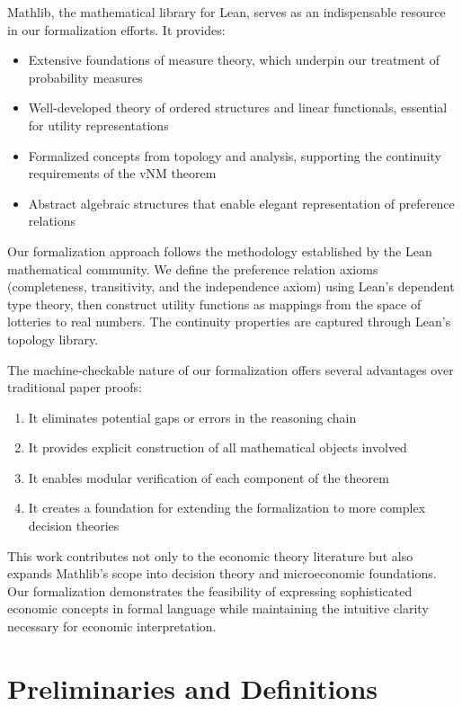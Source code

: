 \documentclass{article}
\theoremstyle{definition}
\begin{document}
Mathlib\cite{MathlibCommunity2020}, the mathematical library for Lean, serves as an indispensable resource in our formalization efforts. It provides:

\begin{itemize}
    \item Extensive foundations of measure theory, which underpin our treatment of probability measures
    \item Well-developed theory of ordered structures and linear functionals, essential for utility representations
    \item Formalized concepts from topology and analysis, supporting the continuity requirements of the vNM theorem
    \item Abstract algebraic structures that enable elegant representation of preference relations
\end{itemize}

Our formalization approach follows the methodology established by the Lean mathematical community. We define the preference relation axioms (completeness, transitivity, and the independence axiom) using Lean's dependent type theory, then construct utility functions as mappings from the space of lotteries to real numbers. The continuity properties are captured through Lean's topology library.

The machine-checkable nature of our formalization offers several advantages over traditional paper proofs:

\begin{enumerate}
    \item It eliminates potential gaps or errors in the reasoning chain
    \item It provides explicit construction of all mathematical objects involved
    \item It enables modular verification of each component of the theorem
    \item It creates a foundation for extending the formalization to more complex decision theories
\end{enumerate}

This work contributes not only to the economic theory literature but also expands Mathlib's scope into decision theory and microeconomic foundations. Our formalization demonstrates the feasibility of expressing sophisticated economic concepts in formal language while maintaining the intuitive clarity necessary for economic interpretation.

\section{Preliminaries and Definitions}\label{suc: preli}
\end{document}
